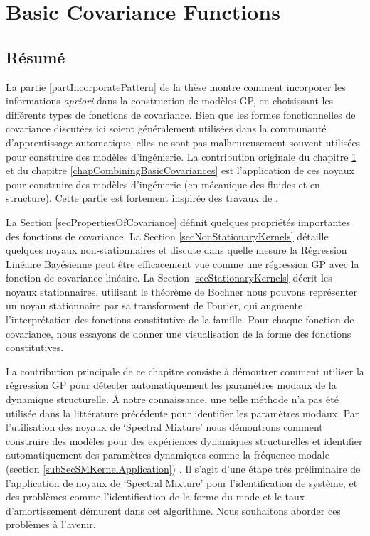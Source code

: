 \chapter{Basic Covariance Functions}
\label{chapBasicCovarianceKernels}

\begin{mdframed}[hidealllines=true,backgroundcolor=lightgray!20]
\section*{Résumé}
La partie \ref{partIncorporatePattern} de la thèse montre comment incorporer les informations \textit{apriori} dans la construction de modèles GP, en choisissant les différents types de fonctions de covariance. Bien que les formes fonctionnelles de covariance discutées ici soient généralement utilisées dans la communauté d'apprentissage automatique, elles ne sont pas malheureusement souvent utilisées pour construire des modèles d'ingénierie. La contribution originale du chapitre \ref{chapBasicCovarianceKernels} et du chapitre \ref{chapCombiningBasicCovariances} est l'application de ces noyaux pour construire des modèles d'ingénierie (en mécanique des fluides et en structure). Cette partie est fortement inspirée des travaux de \cite{duvenaud-thesis-2014, wilson2014thesis, lloyd2014automatic, durrande2001etude}.

La Section \ref{secPropertiesOfCovariance} définit quelques propriétés importantes des fonctions de covariance. La Section \ref{secNonStationaryKernels}  détaille quelques noyaux non-stationnaires et discute dans quelle mesure la Régression Linéaire Bayésienne peut être efficacement vue comme une régression GP avec la fonction de covariance linéaire. La Section \ref{secStationaryKernels} décrit les noyaux stationnaires, utilisant le théorème de Bochner nous pouvons représenter un noyau stationnaire par sa transforment de Fourier, qui augmente l'interprétation des fonctions constitutive de la famille. Pour chaque fonction de covariance, nous essayons de donner une visualisation de la forme des fonctions constitutives. 

La contribution principale de ce chapitre consiste à démontrer comment utiliser la régression GP pour détecter automatiquement les paramètres modaux de la dynamique structurelle. À notre connaissance, une telle méthode n'a pas été utilisée dans la littérature précédente pour identifier les paramètres modaux. Par l'utilisation des noyaux de `Spectral Mixture’ nous démontrons comment construire des modèles pour des expériences dynamiques structurelles et identifier automatiquement des paramètres dynamiques comme la fréquence modale (section \ref{subSecSMKernelApplication}) \cite{chiplunkar2017operational}. Il s'agit d'une étape très préliminaire de l'application de noyaux de `Spectral Mixture’ pour l'identification de système, et des problèmes comme l'identification de la forme du mode et le taux d'amortissement démurent dans cet algorithme. Nous souhaitons aborder ces problèmes à l'avenir.

\end{mdframed}


